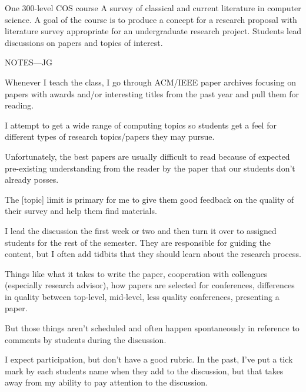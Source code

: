 \documentclass[11pt]{article}
\begin{document}




\tableofcontents

\begin{catalogentry}{One 300-level COS course}
  A survey of classical and current literature in computer science.
  A goal of the course is to produce a concept
  for a research proposal with literature survey appropriate
  for an undergraduate research project.
  Students lead discussions on papers and topics of interest.
\end{catalogentry}

NOTES---JG

Whenever I teach the class, I go through ACM/IEEE paper archives focusing on
papers with awards and/or interesting titles from the past year and pull them
for reading.

I attempt to get a wide range of computing topics so students get a feel for
different types of research topics/papers they may pursue.

Unfortunately, the best papers are usually difficult to read because of
expected pre-existing understanding from the reader by the paper that our
students don't already posses.

The [topic] limit is primary for me to give them good feedback on the quality
of their survey and help them find materials.

I lead the discussion the first week or two and then turn it over to assigned
students for the rest of the semester.  They are responsible for guiding the
content, but I often add tidbits that they should learn about the research
process.

Things like what it takes to write the paper, cooperation with colleagues
(especially research advisor), how papers are selected for conferences,
differences in quality between top-level, mid-level, less quality conferences,
presenting a paper.

But those things aren't scheduled and often happen spontaneously in reference
to comments by students during the discussion.

I expect participation, but don't have a good rubric.  In the past, I've put a
tick mark by each students name when they add to the discussion, but that takes
away from my ability to pay attention to the discussion.
\end{document}
